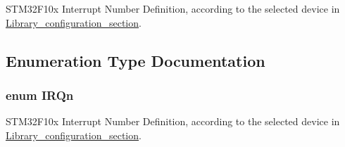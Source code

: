S\+T\+M32\+F10x Interrupt Number Definition, according to the selected device in \hyperlink{group___library__configuration__section}{Library\+\_\+configuration\+\_\+section}. 



\subsection{Enumeration Type Documentation}
\subsubsection[{\texorpdfstring{I\+R\+Qn}{IRQn}}]{\setlength{\rightskip}{0pt plus 5cm}enum {\bf I\+R\+Qn}}\hypertarget{group___configuration__section__for___c_m_s_i_s_ga666eb0caeb12ec0e281415592ae89083}{}\label{group___configuration__section__for___c_m_s_i_s_ga666eb0caeb12ec0e281415592ae89083}


S\+T\+M32\+F10x Interrupt Number Definition, according to the selected device in \hyperlink{group___library__configuration__section}{Library\+\_\+configuration\+\_\+section}. 

